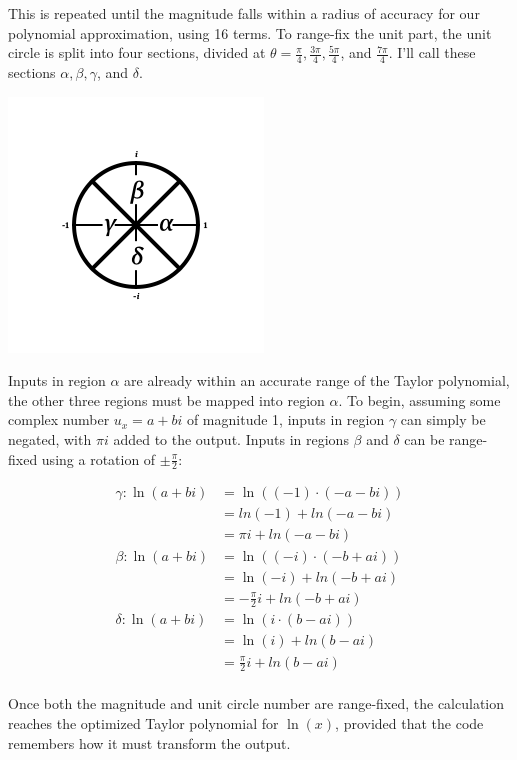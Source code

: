 \documentclass[10pt]{article}
\begin{document}
\begin{multicols}{2}
This is repeated until the magnitude falls within a radius of accuracy for our polynomial approximation, using 16 terms. To range-fix the unit part, the unit circle is split into four sections, divided at $θ = \frac{π}{4}, \frac{3π}{4}, \frac{5π}{4}$, and $\frac{7π}{4}$. I'll call these sections $α, β, γ$, and $δ$.

\includegraphics[scale=1.02]{ln-rf-diagram.png}

Inputs in region $α$ are already within an accurate range of the Taylor polynomial, the other three regions must be mapped into region $α$. To begin, assuming some complex number $u_x = a + bi$ of magnitude 1, inputs in region $γ$ can simply be negated, with $πi$ added to the output. Inputs in regions $β$ and $δ$ can be range-fixed using a rotation of $±\frac{π}{2}$:

\begin{align*}
    γ: \ln(a+bi) &= \ln((-1) · (-a-bi)) \\
    &= ln(-1) + ln(-a-bi) \\
    &= πi + ln(-a-bi) \\
    β: \ln(a+bi) &= \ln((-i) · (-b+ai)) \\
    &= \ln(-i) + ln(-b+ai) \\
    &= -\frac{π}{2}i + ln(-b+ai) \\
    δ: \ln(a+bi) &= \ln(i · (b-ai)) \\
    &= \ln(i) + ln(b-ai) \\
    &= \frac{π}{2}i + ln(b-ai) \\
\end{align*}

Once both the magnitude and unit circle number are range-fixed, the calculation reaches the optimized Taylor polynomial for $\ln(x)$, provided that the code remembers how it must transform the output.

\end{multicols}
\end{document}
